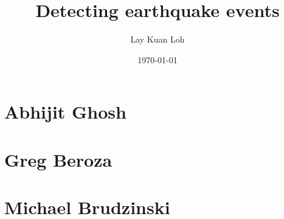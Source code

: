 \documentclass[a4paper, 11pt]{article} %
\title{Detecting earthquake events} %
\author{Lay Kuan Loh} %
\date{\today} %
\begin{document}
\maketitle %


\section{Abhijit Ghosh}









\section{Greg Beroza}






\section{Michael Brudzinski}











\end{document}
